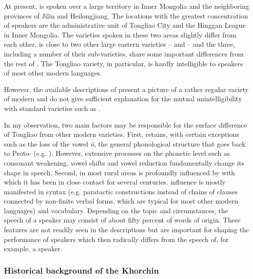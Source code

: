 \documentclass[output=paper,colorlinks,citecolor=brown]{langscibook}
\begin{document}
At present,  is spoken over a large territory in Inner Mongolia and the neighboring provinces of Jilin and Heilongjiang. The locations with the greatest concentration of speakers are the administrative unit of Tongliao City and the Hinggan League in Inner Mongolia. The varieties spoken in these two areas slightly differ from each other.  is close to two other large eastern  varieties –  and  – and the three, including a number of their sub-varieties, share some important differences from the rest of . The Tongliao variety, in particular, is hardly intelligible to speakers of most other modern  languages.

However, the available descriptions of  present a picture of a rather regular variety of modern  and do not give sufficient explanation for the mutual unintelligibility with standard varieties such as .

In my observation, two main factors may be responsible for the surface difference of Tongliao  from other modern  varieties. First,  retains, with certain exceptions such as the loss of the vowel \textit{ö}, the general phonological structure that goes back to Proto- (e.g. \citealt[4]{Janhunen2003a}). However, extensive processes on the phonetic level such as consonant weakening, vowel shifts and vowel reduction fundamentally change its shape in speech. 
Second,  in most rural areas is profoundly influenced by  with which it has been in close contact for several centuries.  influence is mostly manifested in syntax  (e.g. paratactic constructions instead of chains of clauses connected by non-finite verbal forms, which are typical for most other modern  languages) and vocabulary. Depending on the topic and circumstances, the speech of a  speaker may consist of about fifty percent of words of  origin. These features are not readily seen in the descriptions but are important for shaping the performance of  speakers which then radically differs from the speech of, for example, a  speaker.

\subsubsection{Historical background of the Khorchin}
\end{document}
